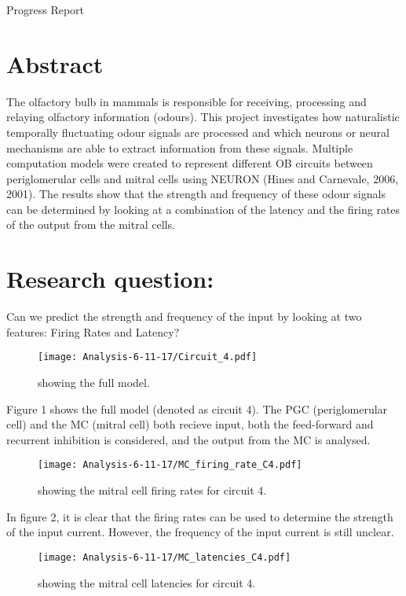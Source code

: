 \documentclass[11pt]{report}
\begin{document}
\begin{center}
{\Huge Progress Report}
\end{center}
\section*{Abstract}
The olfactory bulb in mammals is responsible for receiving, processing and relaying olfactory information (odours). This project investigates how naturalistic temporally fluctuating odour signals are processed and which neurons or neural mechanisms are able to extract information from these signals. Multiple computation models were created to represent different OB circuits between periglomerular cells and mitral cells using NEURON (Hines and Carnevale, 2006, 2001). The results show that the strength and frequency of these odour signals can be determined by looking at a combination of the latency and the firing rates of the output from the mitral cells. 

\section*{Research question:}
Can we predict the strength and frequency of the input by looking at two features: Firing Rates and Latency?\\

\begin{figure}[!ht]
\centering
\texttt{[image: Analysis-6-11-17/Circuit\_4.pdf]}
\caption{showing the full model.}
\end{figure} 

Figure 1 shows the full model (denoted as circuit 4). The PGC (periglomerular cell) and the MC (mitral cell) both recieve input, both the feed-forward and recurrent inhibition is considered, and the output from the MC is analysed. 
\newpage

\begin{figure}[!ht]
\centering
\texttt{[image: Analysis-6-11-17/MC\_firing\_rate\_C4.pdf]}
\caption{showing the mitral cell firing rates for circuit 4.}
\end{figure} 

In figure 2, it is clear that the firing rates can be used to determine the strength of the input current. However, the frequency of the input current is still unclear. 
\newpage

\begin{figure}[!ht]
\centering
\texttt{[image: Analysis-6-11-17/MC\_latencies\_C4.pdf]}
\caption{showing the mitral cell latencies for circuit 4.}
\end{figure} 
\end{document}
